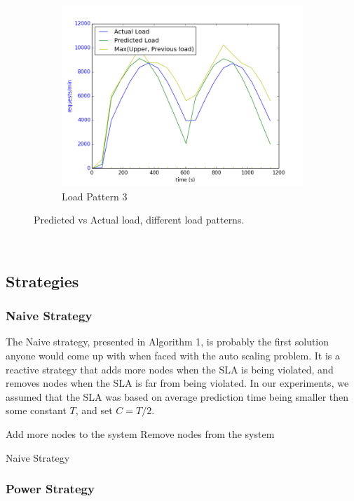 \documentclass[12pt]{article}
\begin{document}
\begin{figure}[h!]
\begin{subfigure}{.6\textwidth}
\includegraphics[width=\textwidth]{Smart382predictedVsActual.png}
\caption{Load Pattern 3}
\end{subfigure}
\caption{Predicted vs Actual load, different load patterns.}
\label{loadsss}
\end{figure}
\newpage

~
\newpage
\subsection{Strategies}
\subsubsection{Naive Strategy}
The Naive strategy, presented in Algorithm 1, is probably the first solution
anyone would come up with when faced with the auto scaling problem. It is a
reactive strategy that adds more nodes when the SLA is being violated, and
removes nodes when the SLA is far from being violated. In our experiments, we
assumed that the SLA was based on average prediction time being smaller then
some constant $T$, and set $C = T / 2$.

\begin{algorithm}[H]
 {
Add more nodes to the system
}
 {
Remove nodes from the system
}
\caption{Naive Strategy}
\end{algorithm}

\subsubsection{Power Strategy}




\end{document}
